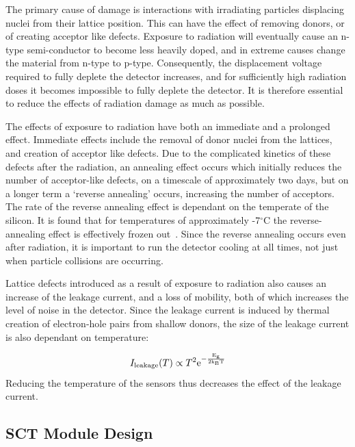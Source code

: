 The primary cause
of damage is interactions with irradiating particles displacing nuclei from
their lattice position. This can have the effect of removing donors, or of
creating acceptor like defects. Exposure to radiation will eventually cause an n-type
semi-conductor to become less heavily doped, and in extreme causes change the
material from n-type to p-type. Consequently, the displacement voltage required
to fully deplete the detector increases, and for sufficiently high radiation doses it
becomes impossible to fully deplete the detector. It is therefore essential to
reduce the effects of radiation damage as much as possible.

The effects of exposure to radiation have both
an immediate and a prolonged effect. Immediate effects include the removal of
donor nuclei from the lattices, and creation of acceptor like defects. Due to the
complicated kinetics of these defects after the radiation, an annealing effect
occurs which initially reduces the number of acceptor-like defects, on a timescale of
approximately two days, but on a longer term a `reverse annealing' occurs,
increasing the number of acceptors. The rate of the reverse annealing effect is dependant on the temperate of the
silicon. It is found that for temperatures of approximately -7$^{\circ}$C the
reverse-annealing effect is effectively frozen out~\cite{Lindstrom2001308}. Since the reverse annealing
occurs even after radiation, it is important to run the detector cooling at all
times, not just when particle collisions are occurring.

Lattice defects introduced as a result of exposure to radiation also causes an
increase of the leakage current, and
a loss of mobility,  both of which increases the level of noise in the detector. Since
the leakage current is induced by thermal creation of electron-hole pairs from
shallow donors, the size of the leakage current is also dependant on
temperature: 

\begin{equation}
I_{\rm{leakage}} (T) \propto T^{2} \rm{e}^{-\frac{E_{g}}{2k_{B}T}}
\end{equation}
Reducing the temperature of the sensors thus decreases the effect of the leakage
current.

\subsection{SCT Module Design}

